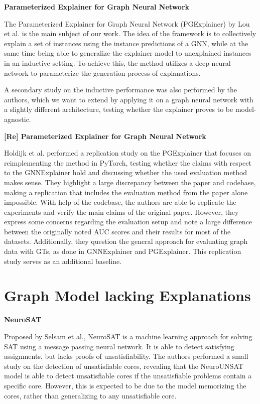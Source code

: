 \textbf{Parameterized Explainer for Graph Neural Network} \par
The Parameterized Explainer for Graph Neural Network (PGExplainer) by Lou et al. \cite{luo2020parameterized} is the main subject of our work. The idea of the framework is to collectively explain a set of instances using the instance predictions of a GNN, while at the same time being able to generalize the explainer model to unexplained instances in an inductive setting. To achieve this, the method utilizes a deep neural network to parameterize the generation process of explanations.

A secondary study on the inductive performance was also performed by the authors, which we want to extend by applying it on a graph neural network with a slightly different architecture, testing whether the explainer proves to be model-agnostic. \bigskip

\textbf{[Re] Parameterized Explainer for Graph Neural Network} \par
Holdijk et al. \cite{holdijk2021re} performed a replication study on the PGExplainer that focuses on reimplementing the method in PyTorch, testing whether the claims with respect to the GNNExplainer hold and discussing whether the used evaluation method makes sense. They highlight a large discrepancy between the paper and codebase, making a replication that includes the evaluation method from the paper alone impossible. With help of the codebase, the authors are able to replicate the experiments and verify the main claims of the original paper. However, they express some concerns regarding the evaluation setup and note a large difference between the originally noted AUC scores and their results for most of the datasets. Additionally, they question the general approach for evaluating graph data with \acp{GT}, as done in GNNExplainer and PGExplainer. This replication study serves as an additional baseline.

\section{Graph Model lacking Explanations}
\label{sec:Downstream_Models}

\textbf{NeuroSAT}\par
Proposed by Selsam et al., NeuroSAT \cite{selsam2018learning} is a machine learning approach for solving SAT using a message passing neural network. It is able to detect satisfying assignments, but lacks proofs of unsatisfiability. The authors performed a small study on the detection of unsatisfiable cores, revealing that the NeuroUNSAT model is able to detect unsatisfiable cores if the unsatisfiable problems contain a specific core. However, this is expected to be due to the model memorizing the cores, rather than generalizing to any unsatisfiable core. 